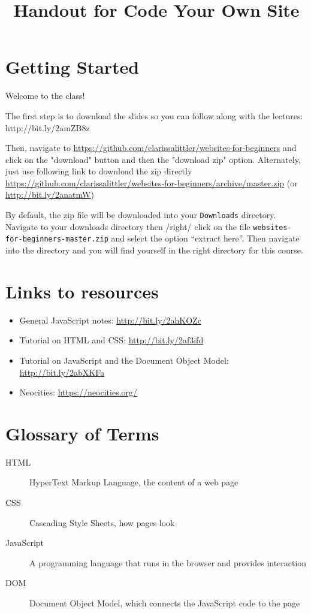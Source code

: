 \documentclass[letterpage,foldmark,10pt,notumble]{leaflet}
\title{Handout for Code Your Own Site}
\author{}
\date{}
\begin{document}
\maketitle
\section{Getting Started}
  Welcome to the class!

  The first step is to download the slides so you can follow along with the lectures: http://bit.ly/2amZB8z

    Then, navigate to \url{https://github.com/clarissalittler/websites-for-beginners} and click on the "download" button and then the "download zip" option. Alternately, just use following link to download the zip directly \url{https://github.com/clarissalittler/websites-for-beginners/archive/master.zip} (or \url{http://bit.ly/2anatmW})

\begin{framed}
  By default, the zip file will be downloaded into your \verb"Downloads" directory. Navigate to your downloads directory then /right/ click on the file \verb"websites-for-beginners-master.zip" and select the option ``extract here''. Then navigate into the directory and you will find yourself in the right directory for this course.
\end{framed}

\section{Links to resources}
\begin{itemize}
  \item General JavaScript notes: \url{http://bit.ly/2ahKOZc}
  \item Tutorial on HTML and CSS: \url{http://bit.ly/2af3ifd}
  \item Tutorial on JavaScript and the Document Object Model: \url{http://bit.ly/2abXKFa}
  \item Neocities: \url{https://neocities.org/}
\end{itemize}

\section{Glossary of Terms}
\begin{description}
  \item [HTML] HyperText Markup Language, the content of a web page
  \item [CSS] Cascading Style Sheets, how pages look
  \item [JavaScript] A programming language that runs in the browser and provides interaction
  \item [DOM] Document Object Model, which connects the JavaScript code to the page
\end{description}
\end{document}
